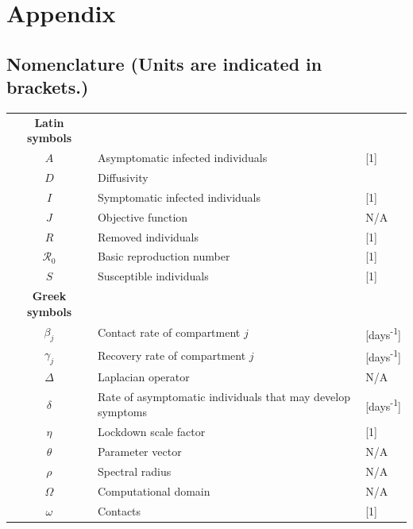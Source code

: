 \documentclass[11pt]{article}
\newcommand{\Ro}{\mathcal{R}_0}
\begin{document}
\section*{Appendix}
	\subsection*{Nomenclature (Units are indicated in brackets.)}
		\begin{longtable}{c l l}
			\textbf{Latin symbols} & & \\
			$A$ & Asymptomatic infected individuals & [1] \\
			$D$ & Diffusivity & \\
			$I$ & Symptomatic infected individuals & [1] \\
			$J$ & Objective function & N/A \\
			$R$ & Removed individuals & [1] \\
			$\Ro$ & Basic reproduction number & [1] \\
			$S$ & Susceptible individuals & [1] \\
			\textbf{Greek symbols} & & \\
			$\beta_j$ & Contact rate of compartment $j$ & [days\textsuperscript{-1}] \\
			$\gamma_j$ & Recovery rate of compartment $j$ & [days\textsuperscript{-1}] \\
			$\Delta$ & Laplacian operator & N/A \\
			$\delta$ & Rate of asymptomatic individuals that may develop symptoms & [days\textsuperscript{-1}] \\
			$\eta$ & Lockdown scale factor & [1] \\
			$\theta$ & Parameter vector & N/A \\
			$\rho$ & Spectral radius & N/A \\
			$\Omega$ & Computational domain & N/A \\
			$\omega$ & Contacts & [1]
		\end{longtable}
	
	\newpage
\end{document}
